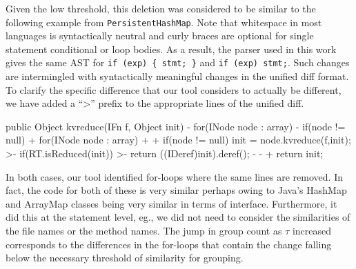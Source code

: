 Given the low threshold, this deletion was considered to be similar to the following
example from {\tt PersistentHashMap}.
Note that whitespace in most languages is syntactically neutral and curly braces
are optional for single statement conditional or loop bodies.  As a result,
the parser used in this work gives the same AST for \verb|if (exp) { stmt; }|
and \verb|if (exp) stmt;|.   Such changes are intermingled with syntactically meaningful
changes in the unified diff format.  To clarify the specific difference that our tool 
considers to actually be different, we have added a ``>'' prefix to the appropriate lines
of the unified diff.

\begin{java}
 public Object kvreduce(IFn f, Object init){
-    for(INode node : array){
-        if(node != null){
+    for(INode node : array)
+        {
+        if(node != null)
             init = node.kvreduce(f,init);
>-                if(RT.isReduced(init))
>-                        return ((IDeref)init).deref();
-               }
-           }
+        }
     return init;
 }
\end{java}

In both cases, our tool identified for-loops where the same lines are removed.
In fact, the code for both of these is very similar perhaps owing to Java's
HashMap and ArrayMap classes being very similar in terms of interface.
Furthermore, it did this at the statement level, eg., we did not need to
consider the similarities of the file names or the method names.  The jump in
group count as $\tau$ increased corresponds to the differences in the for-loops 
that contain the change falling below the necessary threshold of
similarity for grouping.

